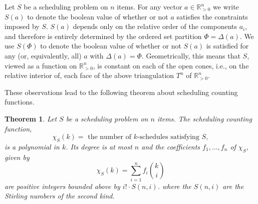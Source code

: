 \documentclass[12pt,reqno]{amsart}
\numberwithin{definition}{section}
\newtheorem{theorem}[definition]{Theorem}
\theoremstyle{definition}
\newcommand{\RR}{\mathbb{R}}
\newcommand{\ZZ}{\mathbb{Z}}
\newcommand{\SSS}{\mathcal{S}}
\newcommand{\ehr}{\operatorname{ehr}}
\newcommand{\ncM}{\mathcal{M}}
\newcommand{\poly}{\chi} %
\begin{document}
Let $S$ be a scheduling problem on $n$ items. For any vector $a\in\RR^n_{> 0}$ we write $S(a)$ to denote the boolean value of whether or not $a$ satisfies the constraints imposed by $S$.  $S(a)$ depends only on the relative order of the components $a_i$, and therefore is entirely determined by the ordered set partition $\Phi=\Delta(a)$. We use $S(\Phi)$ to denote the boolean value of whether or not $S(a)$ is satisfied for any (or, equivalently, all) $a$ with $\Delta(a)=\Phi$. Geometrically, this means that $S$, viewed as a function on $\RR^n_{>0}$, is constant on each of the open cones, i.e., on the relative interior of, each face of the above triangulation $T^n$ of $\RR^n_{> 0}$.

These observations lead to the following theorem about scheduling counting functions. 



\begin{theorem}
\label{fbasis}
Let $S$ be a scheduling problem on $n$ items.
The scheduling counting function,
 $$\poly_S(k) = \textrm{ the number of $k$-schedules satisfying $S$}, $$ is a polynomial in $k$.
  Its degree is at most $n$ and the coefficients $f_1,\ldots,f_n$ of $\poly_S$, given by
\[
  \poly_S(k) = \sum_{i=1}^n f_i\binom{k}{i}
\]
are positive integers bounded above by $i!\cdot S(n,i)$. where the $S(n,i)$ are the Stirling numbers of the second kind.


\end{theorem}
\end{document}
